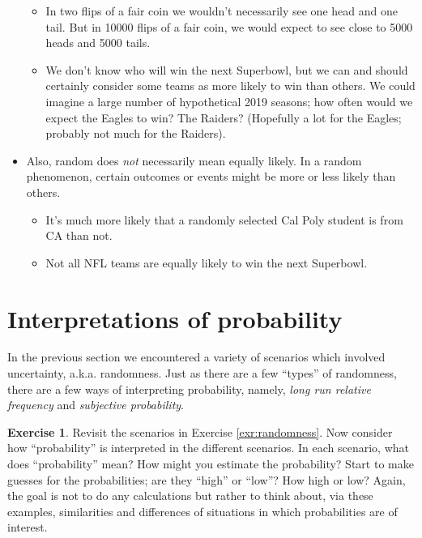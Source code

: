 \documentclass[
]{book}
\providecommand{\tightlist}{%
  \setlength{\itemsep}{0pt}\setlength{\parskip}{0pt}}
\theoremstyle{definition}
\theoremstyle{definition}
\theoremstyle{definition}
\newtheorem{exercise}{Exercise}[chapter]
\theoremstyle{remark}
\begin{document}
\begin{itemize}
  \begin{itemize}
  \tightlist
  \item
    In two flips of a fair coin we wouldn't necessarily see one head and one tail. But in 10000 flips of a fair coin, we would expect to see close to 5000 heads and 5000 tails.
  \item
    We don't know who will win the next Superbowl, but we can and should certainly consider some teams as more likely to win than others. We could imagine a large number of hypothetical 2019 seasons; how often would we expect the Eagles to win? The Raiders? (Hopefully a lot for the Eagles; probably not much for the Raiders).
  \end{itemize}
\item
  Also, random does \emph{not} necessarily mean equally likely. In a random
  phenomenon, certain outcomes or events might be more or less likely than
  others.

  \begin{itemize}
  \tightlist
  \item
    It's much more likely that a randomly selected Cal Poly student is from CA than not.
  \item
    Not all NFL teams are equally likely to win the next Superbowl.
  \end{itemize}
\end{itemize}

\hypertarget{interpretations}{%
\section{Interpretations of probability}\label{interpretations}}

In the previous section we encountered a variety of scenarios which involved uncertainty, a.k.a. randomness. Just as there are a few ``types'' of randomness, there are a few ways of interpreting probability, namely, \emph{long run relative frequency} and \emph{subjective probability}.

\begin{exercise}
\protect\hypertarget{exr:probability-intepret}{}{\label{exr:probability-intepret} }
Revisit the scenarios in Exercise \ref{exr:randomness}. Now consider how ``probability'' is interpreted in the different scenarios. In each scenario, what does ``probability'' mean? How might you estimate the probability? Start to make guesses for the probabilities; are they ``high'' or ``low''? How high or low? Again, the goal is not to do any calculations but rather to think about, via these examples, similarities and differences of situations in which probabilities are of interest.
\end{exercise}
\end{document}
